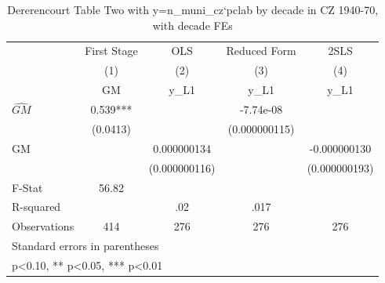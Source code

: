 \begin{table}[htbp]\centering
\def\sym#1{\ifmmode^{#1}\else\(^{#1}\)\fi}
\caption{Dererencourt Table Two with y=n\_muni\_cz`pclab by decade in CZ 1940-70, with decade FEs}
\begin{tabular}{l*{4}{c}}
\toprule
                    & First Stage   &         OLS   &Reduced Form   &        2SLS   \\
                    &\multicolumn{1}{c}{(1)}&\multicolumn{1}{c}{(2)}&\multicolumn{1}{c}{(3)}&\multicolumn{1}{c}{(4)}\\
                    &\multicolumn{1}{c}{GM}&\multicolumn{1}{c}{y\_L1}&\multicolumn{1}{c}{y\_L1}&\multicolumn{1}{c}{y\_L1}\\
\midrule
$\hat{GM}$          &       0.539***&               &   -7.74e-08   &               \\
                    &    (0.0413)   &               &(0.000000115)   &               \\
\addlinespace
GM                  &               & 0.000000134   &               &-0.000000130   \\
                    &               &(0.000000116)   &               &(0.000000193)   \\
\midrule
F-Stat              &       56.82   &               &               &               \\
R-squared           &               &         .02   &        .017   &               \\
Observations        &         414   &         276   &         276   &         276   \\
\bottomrule
\multicolumn{5}{l}{\footnotesize Standard errors in parentheses}\\
\multicolumn{5}{l}{\footnotesize * p<0.10, ** p<0.05, *** p<0.01}\\
\end{tabular}
\end{table}

